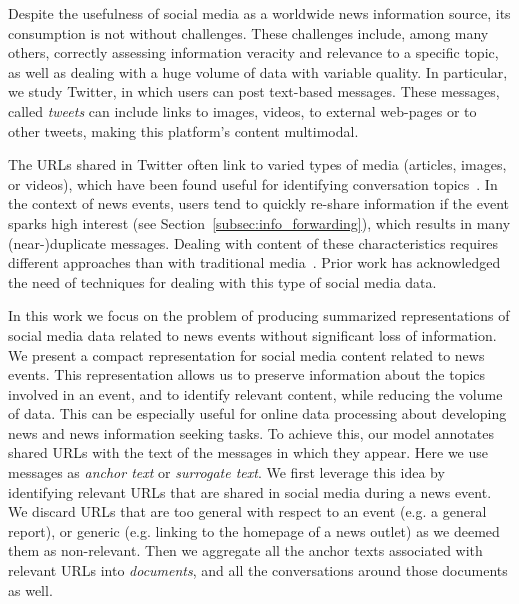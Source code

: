 Despite the usefulness of social media as a worldwide news information source,
its consumption is not without challenges.
%
These challenges include, among many others, correctly assessing information
veracity and relevance to a specific topic, as well as dealing with a huge
volume of data with variable quality. 
%
%
%
%
In particular, we study Twitter, in which users can post text-based messages.
%
These messages, called {\em tweets} can include links to images, videos, to
external web-pages or to other tweets, making this platform's content multimodal.

%
%
The URLs shared in Twitter often link to varied types of media (articles,
images, or videos), which have been found useful for identifying conversation
topics~\cite{mishne2012twanchor}.
%
In the context of news events, users tend to quickly re-share information if the
event sparks high interest (see Section~\ref{subsec:info_forwarding}), which
results in many (near-)duplicate messages.
%
Dealing with content of these characteristics requires different approaches
than with traditional media~\cite{Alonso:2017:WHH:3091478.3091484}.
%
Prior work has acknowledged the need of techniques for dealing with this type of
social media data.





In this work we focus on the problem of producing summarized representations of
social media data related to news events without significant loss of
information.
%
We present a compact representation for social media content related to news
events.
%
This representation allows us to preserve information about the topics involved
in an event, and to identify relevant content, while reducing the volume of
data.
%
This can be especially useful for online data processing about developing news
and news information seeking tasks.
%
To achieve this, our model annotates shared URLs with the text of the messages
in which they appear.
%
Here we use messages as {\em anchor text} or {\em surrogate text}. 
%
We first leverage this idea by identifying relevant URLs that are shared in
social media during a news event.
%
We discard URLs that are too general with respect to an event (e.g. a general
report), or generic (e.g. linking to the homepage of a news outlet) as we deemed
them as non-relevant.
%
Then we aggregate all the anchor texts associated with relevant URLs into {\em
documents}, and all the conversations around those documents as well. 

